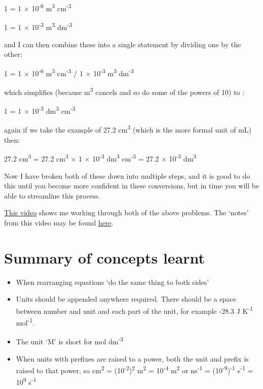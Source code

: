 \documentclass[
]{book}
\providecommand{\tightlist}{%
  \setlength{\itemsep}{0pt}\setlength{\parskip}{0pt}}
\begin{document}
1 = 1 × 10\textsuperscript{-6} m\textsuperscript{3} cm\textsuperscript{-3}

1 = 1 × 10\textsuperscript{-3} m\textsuperscript{3} dm\textsuperscript{-3}

and I can then combine these into a single statement by dividing one by the other:

1 = 1 × 10\textsuperscript{-6} m\textsuperscript{3} cm\textsuperscript{-3} / 1 × 10\textsuperscript{-3} m\textsuperscript{3} dm\textsuperscript{-3}

which simplifies (because m\textsuperscript{3} cancels and so do some of the powers of 10) to :

1 = 1 × 10\textsuperscript{-3} dm\textsuperscript{3} cm\textsuperscript{-3}

again if we take the example of 27.2 cm\textsuperscript{3} (which is the more formal unit of mL) then:

27.2 cm\textsuperscript{3} = 27.2 cm\textsuperscript{3} × 1 × 10\textsuperscript{-3} dm\textsuperscript{3} cm\textsuperscript{-3} = 27.2 × 10\textsuperscript{-3} dm\textsuperscript{3}

Now I have broken both of these down into multiple steps, and it is good to do this until you become more confident in these conversions, but in time you will be able to streamline this process.

\href{https://www.youtube.com/embed/8T3FmZ5oJ-s}{This video} shows me working through both of the above problems. The `notes' from this video may be found \href{http://workitoutwithapencil.xyz/wp-content/uploads/2021/07/UnitConversions.pdf}{here}.

\hypertarget{summary-of-concepts-learnt}{%
\section{Summary of concepts learnt}\label{summary-of-concepts-learnt}}

\begin{itemize}
\tightlist
\item
  When rearranging equations `do the same thing to both sides'
\item
  Units should be appended anywhere required. There should be a space between number and unit and each part of the unit, for example -28.3 J K\textsuperscript{-1} mol\textsuperscript{-1}.
\item
  The unit `M' is short for mol dm\textsuperscript{-3}
\item
  When units with prefixes are raised to a power, both the unit and prefix is raised to that power, so cm\textsuperscript{2} = (10\textsuperscript{-2})\textsuperscript{2} m\textsuperscript{2} = 10\textsuperscript{-4} m\textsuperscript{2} or ns\textsuperscript{-1} = (10\textsuperscript{-9})\textsuperscript{-1} s\textsuperscript{-1} = 10\textsuperscript{9} s\textsuperscript{-1}
\end{itemize}
\end{document}
